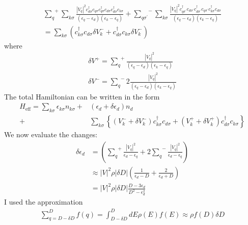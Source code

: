 \documentclass[twoside,11pt]{report}
\numberwithin{equation}{section}
\begin{document}
\begin{equation}\begin{aligned}
{\sum_{q}}^+\sum_{k\sigma} \frac{|V_q|^2c^\dagger_{d\sigma}c_{q\sigma}c^\dagger_{q\sigma}c_{d\sigma}c^\dagger_{d\sigma}c_{k\sigma}}{(\epsilon_q - \epsilon_d)(\epsilon_k - \epsilon_q)} + {\sum_{q\sigma^\prime}}^-\sum_{k\sigma} \frac{|V_q|^2c^\dagger_{q\sigma^\prime}c_{d\sigma^\prime}c^\dagger_{d\sigma^\prime}c_{q\sigma^\prime}c^\dagger_{k\sigma}c_{d\sigma}}{(\epsilon_q - \epsilon_d)(\epsilon_k - \epsilon_q)}\\
=\sum_{k\sigma}\left(c^\dagger_{k\sigma}c_{d\sigma} \delta V^-_k + c^\dagger_{d\sigma}c_{k\sigma}\delta V^-_k\right)
\end{aligned}\end{equation}
where
\begin{equation}\begin{aligned}
\delta V^+ = {\sum_q}^+ \frac{|V_q|^2}{(\epsilon_q - \epsilon_d)(\epsilon_k - \epsilon_q)}\\
\delta V^- = {\sum_q}^- 2\frac{|V_q|^2}{(\epsilon_q - \epsilon_d)(\epsilon_k - \epsilon_q)}
\end{aligned}\end{equation}
The total Hamiltonian can be written in the form
\begin{equation}\begin{aligned}
	H_\text{eff} = \sum_{k\sigma}\epsilon_{k\sigma} n_{k\sigma} + &\left(\epsilon_d + \delta \epsilon_d\right)n_d \\
	+ &\sum_{k\sigma}\left\{\left(V^-_k + \delta V^-_k\right) c^\dagger_{k\sigma}c_{d\sigma} + \left(V^+_k + \delta V^+_k\right) c^\dagger_{d\sigma}c_{k\sigma}\right\}
					     \end{aligned}\end{equation}
We now evaluate the changes:
\begin{equation}\begin{aligned}
	\delta \epsilon_d &= \left({\sum_q}^+\frac{|V_q|^2 }{\epsilon_d - \epsilon_q} + 2{\sum_q}^-\frac{|V_q|^2}{\epsilon_d - \epsilon_q}\right) \\
			  &\approx |V|^2 \rho |\delta D| \left(\frac{1}{\epsilon_d - D} + \frac{2}{\epsilon_d + D}\right)\\
&=|V|^2 \rho |\delta D|\frac{D - 3\epsilon_d}{D^2 - \epsilon_d^2}
\end{aligned}\end{equation}
I used the approximation
\begin{equation}\begin{aligned}
\sum_{q=D-\delta D}^D f(q) = \int_{D- \delta D}^D dE \rho(E) f(E) \approx \rho f(D) \delta D
\end{aligned}\end{equation}
\end{document}
